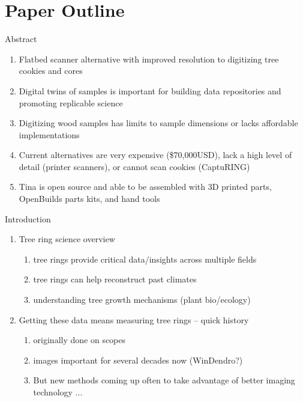 \documentclass{article}
\begin{document}
\section {Paper Outline}
\begin{outline}[enumerate]

\1 Abstract
\begin{enumerate}
	\item Flatbed scanner alternative with improved resolution to digitizing tree cookies and cores
	\item Digital twins of samples is important for building data repositories and promoting replicable science
	\item Digitizing wood samples has limits to sample dimensions or lacks affordable implementations
	\item Current alternatives are very expensive (\$70,000USD), lack a high level of detail (printer scanners), or cannot scan cookies (CaptuRING)
	\item Tina is open source and able to be assembled with 3D printed parts, OpenBuilds parts kits, and hand tools %
\end{enumerate}
\item Introduction
	\begin{enumerate}
	\item Tree ring science overview
		\begin{enumerate}
		\item tree rings provide critical data/insights across multiple fields
		\item tree rings can help reconstruct past climates 
		\item understanding tree growth mechanisms (plant bio/ecology)
		\end{enumerate}
	\item Getting these data means measuring tree rings -- quick history
		\begin{enumerate}
		\item originally done on scopes
		\item images important for several decades now (WinDendro?) 
		\item But new methods coming up often to take advantage of better imaging technology ... 
		\end{enumerate}

\end{enumerate}
\end{outline}
\end{document}
